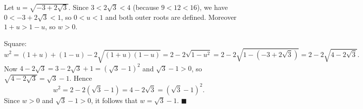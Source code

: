 Let $u=\sqrt{-3+2\sqrt3}$. Since $3<2\sqrt3<4$ (because $9<12<16$), we have $0<-3+2\sqrt3<1$, so $0<u<1$ and both outer roots are defined. Moreover $1+u>1-u$, so $w>0$.

Square:
\[
w^2=(1+u)+(1-u)-2\sqrt{(1+u)(1-u)}=2-2\sqrt{1-u^2}=2-2\sqrt{1-(-3+2\sqrt3)}=2-2\sqrt{4-2\sqrt3}.
\]
Now $4-2\sqrt3=3-2\sqrt3+1=(\sqrt3-1)^2$ and $\sqrt3-1>0$, so $\sqrt{4-2\sqrt3}=\sqrt3-1$. Hence
\[
w^2=2-2(\sqrt3-1)=4-2\sqrt3=(\sqrt3-1)^2 .
\]
Since $w>0$ and $\sqrt3-1>0$, it follows that $w=\sqrt3-1$. $\blacksquare$
